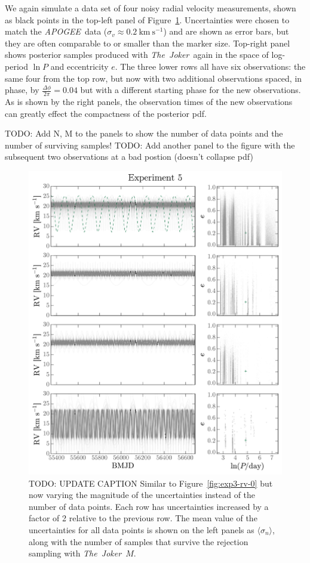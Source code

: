 \documentclass[manuscript, letterpaper]{aastex6}
\newcommand{\project}[1]{\textsl{#1}}
\newcommand{\acronym}[1]{{\small{#1}}}
\newcommand{\apogee}{\project{\acronym{APOGEE}}}
\newcommand{\samplername}{\project{The~Joker}}
\newcommand{\figname}{Figure}
\newcommand{\kms}{\mathrm{km}~\mathrm{s}^{-1}}
\newcommand{\todo}[1]{{\color{red}TODO: #1}}
\begin{document}
We again simulate a data set of four noisy radial velocity measurements, shown
as black points in the top-left panel of \figname~\ref{fig:exp5-rv}.
Uncertainties were chosen to match the \apogee\ data ($\sigma_v \approx
0.2~\kms$) and are shown as error bars, but they are often comparable to or
smaller than the marker size.
Top-right panel shows posterior samples produced with \samplername\ again in the
space of log-period $\ln P$ and eccentricity $e$.
The three lower rows all have six observations: the same four from the top row,
but now with two additional observations spaced, in phase, by $\frac{\Delta
\phi}{2 \pi} = 0.04$ but with a different starting phase for the new
observations.
As is shown by the right panels, the observation times of the new observations
can greatly effect the compactness of the posterior pdf.

\todo{Add N, M to the panels to show the number of data points and the number of
surviving samples!}
\todo{Add another panel to the figure with the subsequent two observations at a
bad postion (doesn't collapse pdf)}

\begin{figure}[p]
\begin{center}
\includegraphics[width=\textwidth]{figures/exp5-rv-curves.pdf}
\end{center}
\caption{%
\todo{UPDATE CAPTION}
Similar to \figname~\ref{fig:exp3-rv-0} but now varying the magnitude of the
uncertainties instead of the number of data points.
Each row has uncertainties increased by a factor of 2 relative to the previous
row.
The mean value of the uncertainties for all data points is shown on the left
panels as $\langle \sigma_n \rangle$, along with the number of samples that
survive the rejection sampling with \samplername\, $M$.
\label{fig:exp5-rv}}
\end{figure}
\end{document}
